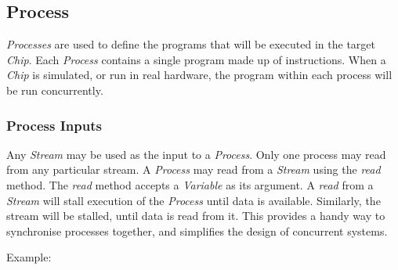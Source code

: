 \documentclass[letterpaper,10pt,english]{manual}
\begin{document}
\subsection{Process}
\hypertarget{module-chips.process}{}
\modulesynopsis{}
\emph{Processes} are used to define the programs that will be executed in the target
\emph{Chip}.  Each \emph{Process} contains a single program made up of instructions. When
a \emph{Chip} is simulated, or run in real hardware, the program within each process
will be run concurrently.


\subsubsection{Process Inputs}

Any \emph{Stream} may be used as the input to a \emph{Process}. Only one process may read
from any particular stream.  A \emph{Process} may read from a \emph{Stream} using the
\emph{read} method. The \emph{read} method accepts a \emph{Variable} as its argument. A \emph{read}
from a \emph{Stream} will stall execution of the \emph{Process} until data is available.
Similarly, the stream will be stalled, until data is read from it. This
provides a handy way to synchronise processes together, and simplifies the
design of concurrent systems.

Example:
\end{document}
